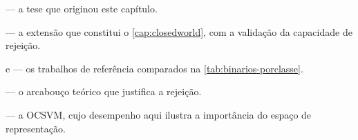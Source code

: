 \begin{leituras}
\item \citet{LopesTese2025} --- a tese que originou este capítulo.
\item \citet{Lopes2026PST} --- a extensão que constitui o \cref{cap:closedworld}, com a
      validação da capacidade de rejeição.
\item \citet{Marins2021} e \citet{marins2020fault} --- os trabalhos de referência
      comparados na \cref{tab:binarios-porclasse}.
\item \citet{Scheirer2013} --- o arcabouço teórico que justifica a rejeição.
\item \citet{Smola2004} --- a OCSVM, cujo desempenho aqui ilustra a importância do
      espaço de representação.
\end{leituras}
